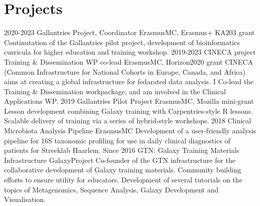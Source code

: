 \documentclass[]{shiltemann-cv}
\begin{document}
\section{Projects}

\begin{entrylist}
   \entry
    {2020-2023}
    {Gallantries Project, Coordinator}
    {ErasmusMC, Erasmus+ KA203 grant}
    {Continutation of the Gallantries pilot project, development of bioinformatics curricula for higher education and training workshop.}
   \entry
    {2019-2023}
    {CINECA project Training \& Dissemination WP co-lead}
    {ErasmusMC, Horizon2020 grant}
    {CINECA (Common Infrastructure for National Cohorts in Europe, Canada, and Africa) aims at creating a global infrastructure for fedarated data analysis. I Co-lead the Training \& Dissemination  workpackage, and am involved in the Clinical Applications WP.}
   \entry
    {2019}
    {Gallantries Pilot Project}
    {ErasmusMC, Mozilla mini-grant}
    {Lesson development combining Galaxy training with Carpentries-style R lessons. Scalable delivery of training via a series of hybrid-style workshops.}
  \entry
    {2018}
    {Clinical Microbiota Analysis Pipeline}
    {ErasmusMC}
    {Development of a user-friendly analysis pipeline for 16S taxonomic profiling for use in daily clinical diagnostics of patients for Streeklab Haarlem.}
  \entry
    {Since 2016}
    {GTN: Galaxy Training Materials Infrastructure}
    {GalaxyProject}
    {Co-founder of the GTN infrastructure for the collaborative development of Galaxy training materials. Community building efforts to ensure utility for educators.  Development of several tutorials on the topics of Metagenomics, Sequence Analysis, Galaxy Development and Visualisation.  }



\end{entrylist}
\end{document}
